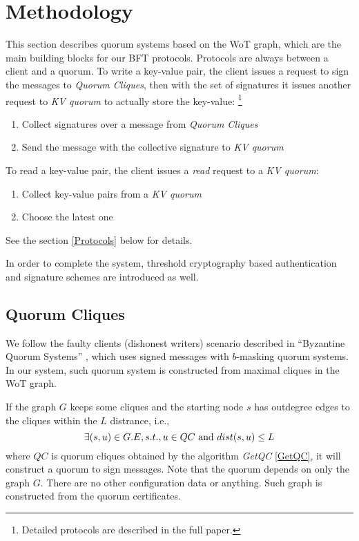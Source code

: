 \section{Methodology}
This section describes quorum systems based on the WoT graph, which
are the main building blocks for our BFT protocols. Protocols are
always between a client and a quorum. To write a key-value pair, the
client issues a request to sign the messages to {\em Quorum Cliques},
then with the set of signatures it issues another request to {\em KV
  quorum} to actually store the key-value:
\ifdefined\ABSTRACT
\footnote{Detailed protocols are described in the full paper.}
\fi
\begin{enumerate}
\item Collect signatures over a message from {\em Quorum Cliques}
\item Send the message with the collective signature to {\em
    KV quorum}
\end{enumerate}
To read a key-value pair, the client issues a {\em read}
request to a {\em KV quorum}:
\begin{enumerate}
\item Collect key-value pairs from a {\em KV quorum}
\item Choose the latest one
\end{enumerate}
\ifdefined\ABSTRACT
\else
See the section \ref{Protocols} below for details.
\fi

In order to complete the system, threshold cryptography based
authentication and signature schemes are introduced as well.

\subsection{Quorum Cliques}
We follow the faulty clients (dishonest writers) scenario described in
``Byzantine Quorum Systems'' \cite{Delhi:1,Delhi:2}, which uses signed
messages with $b$-masking quorum systems. In our system, such quorum
system is constructed from maximal cliques in the WoT graph.

If the graph $G$ keeps some cliques and the starting node $s$ has
outdegree edges to the cliques within the $L$ distrance, i.e.,
\[
\exists (s, u) \in G.E, s.t., u \in QC \text{ and } dist(s, u) \le L \\
\]
where $QC$ is quorum cliques obtained by the algorithm {\em GetQC}
\ref{GetQC},
it will construct a quorum to sign messages. Note that the quorum
depends on only the graph $G$. There are no other configuration data
or anything.
Such graph is constructed from the quorum certificates. 

